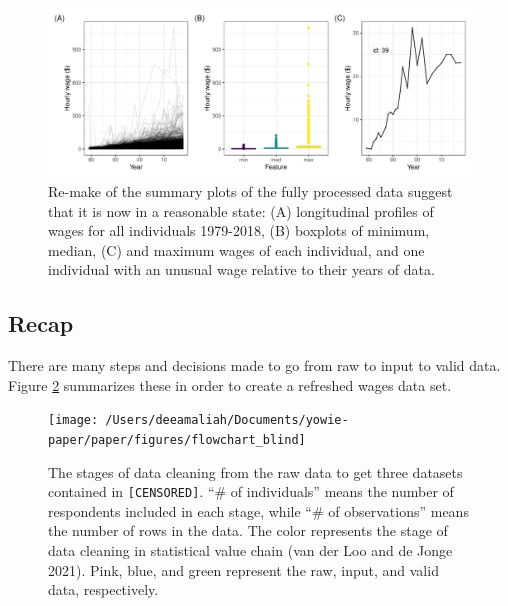 \documentclass{article}
\begin{document}
\begin{figure}

{\centering \includegraphics[width=1\linewidth]{figures/fixed-feature-plot-1} 

}

\caption{Re-make of the summary plots of the fully processed data suggest that it is now in a reasonable state: (A) longitudinal profiles of wages for all individuals 1979-2018, (B) boxplots of minimum, median, (C) and maximum wages of each individual, and one individual with an unusual wage relative to their years of data. }\label{fig:fixed-feature-plot}
\end{figure}

\hypertarget{recap}{%
\subsection{Recap}\label{recap}}

There are many steps and decisions made to go from raw to input to valid data. Figure \ref{fig:flow-chart-blind} summarizes these in order to create a refreshed wages data set.



\begin{figure}

{\centering \texttt{[image: /Users/deeamaliah/Documents/yowie-paper/paper/figures/flowchart\_blind]} 

}

\caption{The stages of data cleaning from the raw data to get three datasets contained in \texttt{[CENSORED]}. ``\# of individuals'' means the number of respondents included in each stage, while ``\# of observations'' means the number of rows in the data. The color represents the stage of data cleaning in statistical value chain (van der Loo and de Jonge 2021). Pink, blue, and green represent the raw, input, and valid data, respectively.}\label{fig:flow-chart-blind}
\end{figure}
\end{document}
